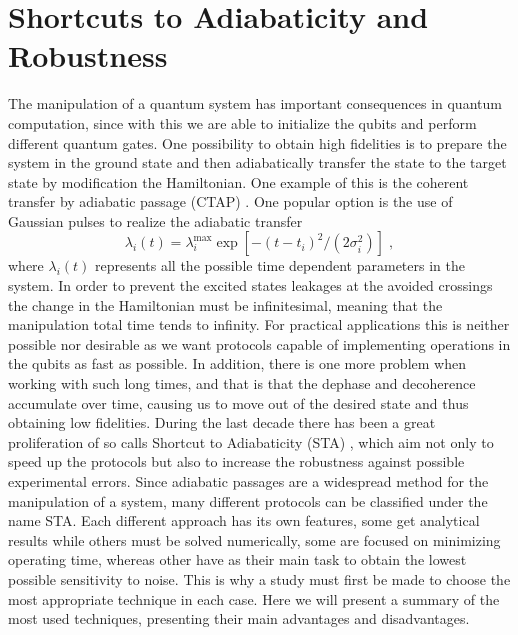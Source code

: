 
\chapter{Shortcuts to Adiabaticity and Robustness} %

\label{sec:Shortcuts_to_Adiabaticity} %


The manipulation of a quantum system has important consequences in quantum computation, since with this we are able to initialize the qubits and perform different quantum gates. One possibility to obtain high fidelities is to prepare the system in the ground state and then adiabatically transfer the state to the target state by modification the Hamiltonian. One example of this is the coherent transfer by adiabatic passage (CTAP) \cite{Greentree2004}. One popular option is the use of Gaussian pulses to realize the adiabatic transfer
\begin{equation}
	\lambda_i(t)=\lambda_i^{\max}\exp[-(t-t_i)^2/(2\sigma_i^2)]\; ,
\end{equation}
where $\lambda_i(t)$ represents all the possible time dependent parameters in the system. In order to prevent the excited states leakages at the avoided crossings the change in the Hamiltonian must be infinitesimal, meaning that the manipulation total time tends to infinity. For practical applications this is neither possible nor desirable as we want protocols capable of implementing operations in the qubits as fast as possible. In addition, there is one more problem when working with such long times, and that is that the dephase and decoherence accumulate over time, causing us to move out of the desired state and thus obtaining low fidelities. During the last decade there has been a great proliferation of so calls Shortcut to Adiabaticity (STA) \cite{Chen2010}, which aim not only to speed up the protocols but also to increase the robustness against possible experimental errors. Since adiabatic passages are a widespread method for the manipulation of a system, many different protocols can be classified under the name STA. Each different approach has its own features, some get analytical results while others must be solved numerically, some are focused on minimizing operating time, whereas other have as their main task to obtain the lowest possible sensitivity to noise. This is why a study must first be made to choose the most appropriate technique in each case. Here we will present a summary of the most used techniques, presenting their main advantages and disadvantages.

